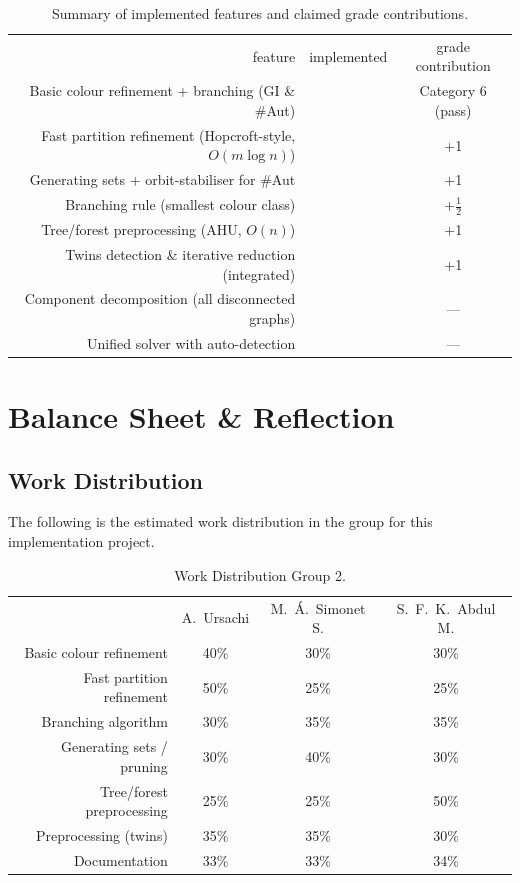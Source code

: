 \documentclass[twoside]{article}
\newcommand{\cmark}{\ding{51}}%
\begin{document}
\begin{table}[H]
\centering
\begin{tabular}{r|c|c}
feature & implemented & grade contribution \\
\noalign{\smallskip}\hline\hline\noalign{\smallskip}
Basic colour refinement + branching (GI \& \#Aut) & \cmark & Category 6 (pass) \\
Fast partition refinement (Hopcroft-style, $O(m\log n)$) & \cmark & +1 \\
Generating sets + orbit-stabiliser for \#Aut & \cmark & +1 \\
Branching rule (smallest colour class) & \cmark & +$\tfrac{1}{2}$ \\
Tree/forest preprocessing (AHU, $O(n)$) & \cmark & +1 \\
Twins detection \& iterative reduction (integrated) & \cmark & +1 \\
Component decomposition (all disconnected graphs) & \cmark & --- \\
Unified solver with auto-detection & \cmark & --- \\
\end{tabular}
\caption{Summary of implemented features and claimed grade contributions.}\label{tab:summary}
\end{table}


\section{Balance Sheet \& Reflection}

\subsection{Work Distribution}
The following is the estimated work distribution in the group for this implementation project.
\begin{table}[H]
\centering
\begin{tabular}{r|c|c|c|}
& A.\ Ursachi & M.\ \'{A}.\ Simonet S. & S.\ F.\ K.\ Abdul M.\\
\noalign{\smallskip}\hline\hline\noalign{\smallskip}
Basic colour refinement     & 40\% & 30\% & 30\% \\
Fast partition refinement   & 50\% & 25\% & 25\% \\
Branching algorithm         & 30\% & 35\% & 35\% \\
Generating sets / pruning   & 30\% & 40\% & 30\% \\
Tree/forest preprocessing   & 25\% & 25\% & 50\% \\
Preprocessing (twins)       & 35\% & 35\% & 30\% \\
Documentation               & 33\% & 33\% & 34\% \\
\end{tabular}
\caption{Work Distribution Group 2.}\label{tab:workdistr}
\end{table}
\end{document}
